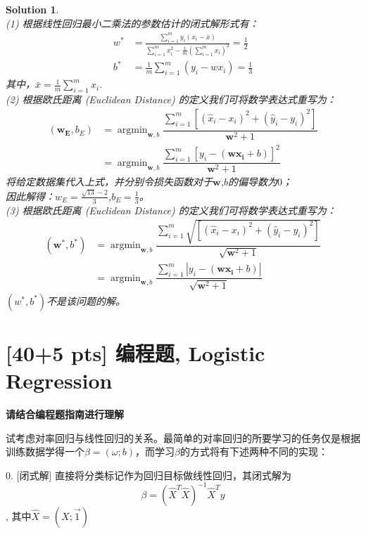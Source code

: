 \documentclass[a4paper,UTF8]{article}
\numberwithin{equation}{section}
\newtheorem*{solution}{Solution}
\begin{document}
\begin{solution}
~\\\textsc{(1)} 根据线性回归最小二乘法的参数估计的闭式解形式有：
	\begin{equation}\nonumber
	\begin{aligned}
	w^* &= \frac{\sum\limits_{i=1}^{m} y_i(x_i-\bar{x})}{\sum\limits_{i=1}^{m} x_i^2-\frac{1}{m}\left(\sum\limits_{i=1}^{m} x_i\right)^2} = \frac{1}{2}\\
	b^* &= \frac{1}{m} \sum_{i=1}^m (y_i-wx_i) = \frac{1}{3}			
	\end{aligned}
	\end{equation}
	其中，$\bar{x}=\frac{1}{m}\sum_{i=1}^mx_i.$
\\\textsc{(2)} 根据欧氏距离 \textsl{(Euclidean Distance)} 的定义我们可将数学表达式重写为：
 	\begin{equation}\nonumber
 	\begin{aligned}
	(\mathbf{w_E},b_E) &= \mathop{\arg\min}_{\mathbf{w},b} \dfrac{\sum\limits_{i=1}^m [(\hat x_i - x_i)^2+(\hat y_i - y_i)^2]}{\mathbf{w}^2+1}
	\\ &= \mathop{\arg\min}_{\mathbf{w},b} \dfrac{\sum\limits_{i=1}^m [y_i-(\mathbf{w}\mathbf{x_i}+b)]^2}{\mathbf{w}^2+1}
	\end{aligned}	
	\end{equation}
	将给定数据集代入上式，并分别令损失函数对于$\mathbf{w}$,$b$的偏导数为$0$；\\
	因此解得：$w_E = \frac{\sqrt{13}-2}{3}$,$b_E = \frac{1}{3}$。
\\\textsc{(3)} 根据欧氏距离 \textsl{(Euclidean Distance)} 的定义我们可将数学表达式重写为：
 	\begin{equation}\nonumber
 	\begin{aligned}
 	(\mathbf{w^*},b^*) &= \mathop{\arg\min}_{\mathbf{w},b} \dfrac{\sum\limits_{i=1}^m \sqrt{[(\hat x_i - x_i)^2+(\hat y_i - y_i)^2]}}{\sqrt{\mathbf{w}^2+1}}
	\\ &= \mathop{\arg\min}_{\mathbf{w},b} \dfrac{\sum\limits_{i=1}^m |y_i-(\mathbf{w}\mathbf{x_i}+b)|}{\sqrt{\mathbf{w}^2+1}}
	\end{aligned}	
	\end{equation}
	$(w^*,b^*)$不是该问题的解。
\end{solution}

\section{[40+5 pts] 编程题, Logistic Regression}
\textbf{请结合编程题指南进行理解}
\par 试考虑对率回归与线性回归的关系。最简单的对率回归的所要学习的任务仅是根据训练数据学得一个$\beta=(\omega;b)$，而学习$\beta$的方式将有下述两种不同的实现：
\par 0. [闭式解] 直接将分类标记作为回归目标做线性回归，其闭式解为 \begin{equation}
	\beta=({\hat{X}}^T\hat{X})^{-1}\hat{X}^Ty
	\end{equation}, 其中$\hat{X}=(X;\vec{1})$
\end{document}
